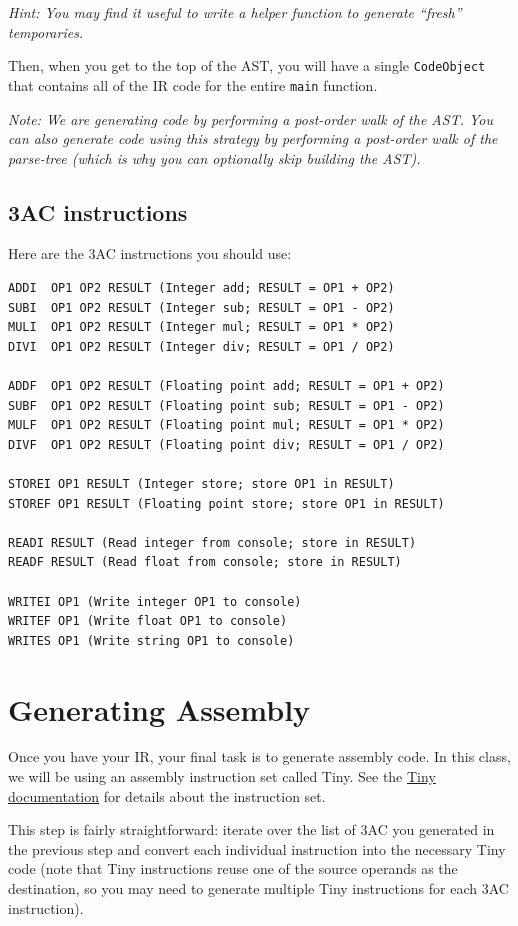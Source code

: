 \documentclass{article}
\begin{document}
{\em Hint: You may find it useful to write a helper function to generate ``fresh'' temporaries.}

Then, when you get to the top of the AST, you will have a single \texttt{CodeObject} that contains all of the IR code for the entire \texttt{main} function.

{\em Note: We are generating code by performing a post-order walk of the AST. You can also generate code using this strategy by performing a post-order walk of the parse-tree (which is why you can optionally skip building the AST).}

\subsection{3AC instructions}

Here are the 3AC instructions you should use:
\begin{lstlisting}[numbers=none]
ADDI  OP1 OP2 RESULT (Integer add; RESULT = OP1 + OP2)
SUBI  OP1 OP2 RESULT (Integer sub; RESULT = OP1 - OP2)
MULI  OP1 OP2 RESULT (Integer mul; RESULT = OP1 * OP2)
DIVI  OP1 OP2 RESULT (Integer div; RESULT = OP1 / OP2)

ADDF  OP1 OP2 RESULT (Floating point add; RESULT = OP1 + OP2)
SUBF  OP1 OP2 RESULT (Floating point sub; RESULT = OP1 - OP2)
MULF  OP1 OP2 RESULT (Floating point mul; RESULT = OP1 * OP2)
DIVF  OP1 OP2 RESULT (Floating point div; RESULT = OP1 / OP2)

STOREI OP1 RESULT (Integer store; store OP1 in RESULT)
STOREF OP1 RESULT (Floating point store; store OP1 in RESULT)

READI RESULT (Read integer from console; store in RESULT)
READF RESULT (Read float from console; store in RESULT)

WRITEI OP1 (Write integer OP1 to console)
WRITEF OP1 (Write float OP1 to console)
WRITES OP1 (Write string OP1 to console)
\end{lstlisting}

\section{Generating Assembly}
Once you have your IR, your final task is to generate assembly code. In this class, we will be using an assembly instruction set called Tiny. See the \href{https://hegden.github.io/cs406/homeworks/PA4/tinyDoc.txt}{Tiny documentation} for details about the instruction set.

This step is fairly straightforward: iterate over the list of 3AC you generated in the previous step and convert each individual instruction into the necessary Tiny code (note that Tiny instructions reuse one of the source operands as the destination, so you may need to generate multiple Tiny instructions for each 3AC instruction).
\end{document}
